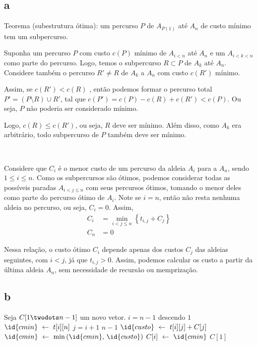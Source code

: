 \subsection{a} \label{sec:2:a}

Teorema (subestrutura ótima): um percurso $P$ de $A_{P(1)}$ até $A_n$ de custo mínimo tem um subpercurso.

Suponha um percurso $P$ com custo $c(P)$ mínimo de $A_{i < n}$ até $A_n$ e um $A_{i < k < n}$ como parte do percurso. Logo, temos o subpercurso $R \subset P$ de $A_k$ até $A_n$. Considere também o percurso $R' \ne R$ de $A_k$ a $A_n$ com custo $c\left(R'\right)$ mínimo.

Assim, se $c\left(R'\right) < c(R)$ , então podemos formar o percurso total $P' = (P \setminus R) \cup R'$, tal que $c\left(P'\right) = c(P) - c(R) + c\left(R'\right) < c(P)$. Ou seja, $P$ não poderia ser considerado mínimo.

Logo, $c(R) \leq c\left(R'\right)$, ou seja, $R$ deve ser mínimo. Além disso, como $A_k$ era arbitrário, todo subpercurso de $P$ também deve ser mínimo.

~

Considere que $C_i$ é o menor custo de um percurso da aldeia $A_i$ para a $A_n$, sendo $1 \leq i \leq n$. Como os subpercursos são ótimos, podemos considerar todas as possíveis paradas $A_{i < j \leq n}$ com seus percursos ótimos, tomando o menor deles como parte do percurso ótimo de $A_i$. Note se $i = n$, então não resta nenhuma aldeia no percurso, ou seja, $C_i = 0$. Assim,
\begin{align*}
    C_i &= \min_{i < j \leq n}\left\{t_{i, j} + C_j\right\} \\
    C_n &= 0
\end{align*}

Nessa relação, o custo ótimo $C_i$ depende apenas dos custos $C_j$ das aldeias seguintes, com $i < j$, já que $t_{i, j} > 0$. Assim, podemos calcular os custo a partir da última aldeia $A_n$, sem necessidade de recursão ou memprização.

\itemdsep
\subsection{b}

\begin{codebox}
    \li Seja $C[1 \twodots n - 1]$ um novo vetor. \label{linha:a1:1}
    \li
    \li {} $i = n - 1$ descendo  $1$ \label{linha:for:1}
        \Do
    \li     $\id{cmin} \gets t[i][n]$ \label{linha:a2:1}
    \li     {} $j = i + 1$  $n - 1$ \label{linha:for:2}
            \Do
    \li         $\id{custo} \gets t[i][j] + C[j]$ \label{linha:a3:1}
    \li         $\id{cmin} \gets \min\left(\id{cmin},\, \id{custo}\right)$ \label{linha:a3:2}
            \End
    \li     $C[i] \gets \id{cmin}$ \label{linha:a2:2}
        \End
    \li
    \li {} $C[1]$ \label{linha:a1:2}
\end{codebox}

